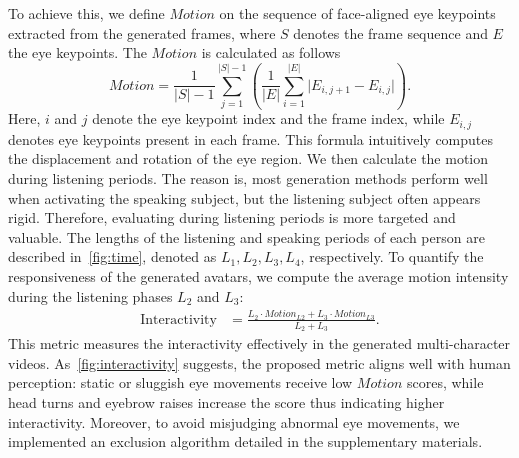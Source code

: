 To achieve this, we define $Motion$ on the sequence of face-aligned eye keypoints extracted from the generated frames, where $S$ denotes the frame sequence and $E$ the eye keypoints.
The $Motion$ is calculated as follows
\begin{equation}
    Motion = \frac{1}{|S| - 1} \sum_{j=1}^{|S| - 1} \left( \frac{1}{|E|} \sum_{i=1}^{|E|} \vert E_{i,j+1} - E_{i,j}\vert \right).
\end{equation}
Here, $i$ and $j$ denote the eye keypoint index and the frame index, while \( E_{i,j} \) denotes eye keypoints present in each frame.
This formula intuitively computes the displacement and rotation of the eye region.
We then calculate the motion during listening periods. 
The reason is, most generation methods perform well when activating the speaking subject, but the listening subject often appears rigid. 
Therefore, evaluating during listening periods is more targeted and valuable.
The lengths of the listening and speaking periods of each person are described in~\cref{fig:time}, denoted as \( L_1, L_2, L_3, L_4 \), respectively.
To quantify the responsiveness of the generated avatars, we compute the average motion intensity during the listening phases $L_2$ and $L_3$:
\begin{equation}
\begin{aligned}
\text{Interactivity} &= \frac{L_2 \cdot Motion_{L2} + L_3 \cdot Motion_{L3}}{L_2 + L_3}.
\end{aligned}
\end{equation}
This metric measures the interactivity effectively in the generated multi-character videos. 
As~\cref{fig:interactivity} suggests, the proposed metric aligns well with human perception: static or sluggish eye movements receive low $Motion$ scores, while head turns and eyebrow raises increase the score thus indicating higher interactivity.
Moreover, to avoid misjudging abnormal eye movements, we implemented an exclusion algorithm detailed in the supplementary materials.



